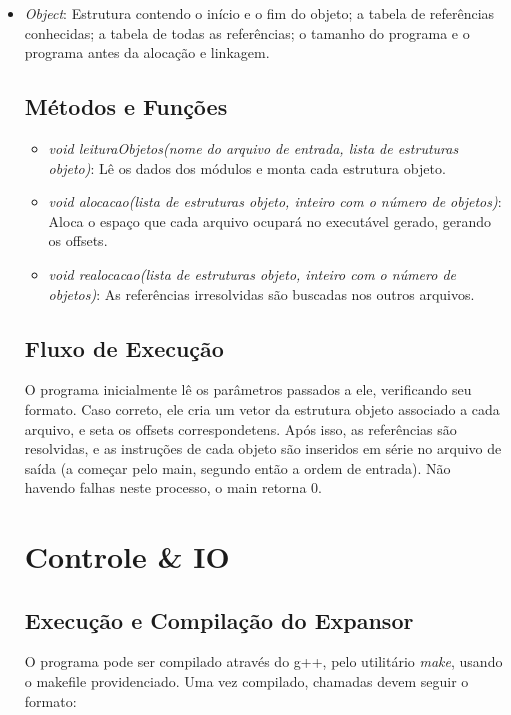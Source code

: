 \documentclass[12pt, a4paper]{article}
\begin{document}
\begin{itemize}
	\item \emph{Object}: Estrutura contendo o início e o fim do objeto; a tabela de referências conhecidas; a tabela de todas as referências; o tamanho do programa e o programa antes da alocação e linkagem. 


\subsection{Métodos e Funções}
\begin{itemize}
	\item \emph{void leituraObjetos(nome do arquivo de entrada, lista de estruturas objeto)}: Lê os dados dos módulos e monta cada estrutura objeto.
	\item \emph{void alocacao(lista de estruturas objeto, inteiro com o número de objetos)}: Aloca o espaço que cada arquivo ocupará no executável gerado, gerando os offsets.
	
	\item \emph{void realocacao(lista de estruturas objeto, inteiro com o número de objetos)}: As referências irresolvidas são buscadas nos outros arquivos.
	
\end{itemize}

\subsection{Fluxo de Execução}

O programa inicialmente lê os parâmetros passados a ele, verificando seu formato. Caso correto, ele cria um vetor da estrutura objeto associado a cada arquivo, e seta os offsets correspondetens. Após isso, as referências são resolvidas, e as instruções de cada objeto são inseridos em série no arquivo de saída (a começar pelo main, segundo então a ordem de entrada). Não havendo falhas neste processo, o main retorna 0.

\section{Controle \& IO}

\subsection{Execução e Compilação do Expansor}

O programa pode ser compilado através do g++, pelo utilitário \emph{make}, usando o makefile providenciado. Uma vez compilado, chamadas devem seguir o formato:


\end{itemize}
\end{document}
